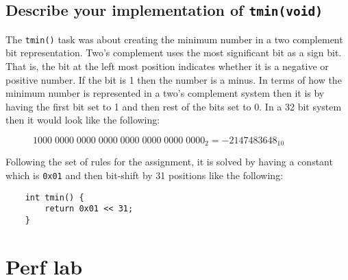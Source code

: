 \documentclass[11pt]{article}
\newcommand{\code}[1]{{\colorbox{lightgray!15}{\color{black}\texttt{#1}}}}
\begin{document}
\subsection{Describe your implementation of \code{tmin(void)}}
The \code{tmin()} task was about creating the minimum number in a two complement bit representation.
Two's complement uses the most significant bit as a sign bit. That is, the bit at the left most position indicates whether 
it is a negative or positive number. If the bit is 1 then the number is a minus. 
In terms of how the minimum number is represented in a two's complement system then it is by having the first bit set to 1 and then rest of the bits set to 0.
In a 32 bit system then it would look like the following:

\begin{figure}[h]
    $1000 \; 0000 \; 0000 \; 0000 \; 0000 \; 0000 \; 0000 \; 0000_2 = -2147483648_{10}$
    \centering
\end{figure}


Following the set of rules for the assignment, it is solved by having a constant which is \code{0x01}
and then bit-shift by 31 positions like the following:
\begin{lstlisting}
    int tmin() {
        return 0x01 << 31;
    }
\end{lstlisting}


\section{Perf lab}
\end{document}
